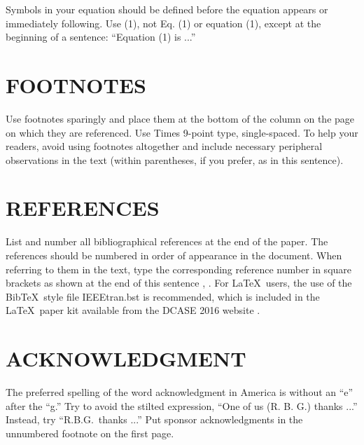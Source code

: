 \documentclass{article}
\begin{document}
\begin{sloppy}
Symbols in your equation should be defined before the equation appears or immediately following.  Use (1), not Eq. (1) or equation (1), except at the beginning of a sentence:  ``Equation (1) is ...''



\section{FOOTNOTES}
\label{sec:foot}

Use footnotes sparingly and place them at the bottom of the column on the page on which they are referenced. Use Times 9-point type, single-spaced. To help your readers, avoid using footnotes altogether and include necessary peripheral observations in the text (within parentheses, if you prefer, as in this sentence).

\section{REFERENCES}
\label{sec:ref}

List and number all bibliographical references at the end of the paper. The references should be numbered in order of appearance in the document. When referring to them in the text, type the corresponding reference number in square brackets as shown at the end of this sentence \cite{cJones2003}, \cite{aSmith2000}. For \LaTeX\ users, the use of the Bib\TeX\ style file IEEEtran.bst is recommended, which is included in the \LaTeX\ paper kit available from the DCASE 2016 website \cite{dcase2016web}.

\section{ACKNOWLEDGMENT}
\label{sec:ack}

The preferred spelling of the word acknowledgment in America is without an ``e'' after the ``g.'' Try to avoid the stilted expression, ``One of us (R. B. G.) thanks ...'' Instead, try ``R.B.G.\ thanks ...''  Put sponsor acknowledgments in the unnumbered footnote on the first page.


\end{sloppy}
\end{document}
